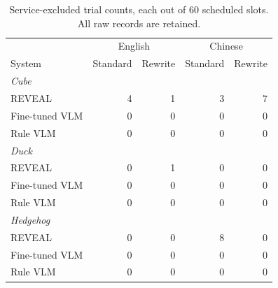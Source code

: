 \begin{table}[t]
\centering\footnotesize
\setlength{\tabcolsep}{2pt}
\begin{tabular}{@{}lrrrr@{}}
\toprule
 & \multicolumn{2}{c}{English} & \multicolumn{2}{c}{Chinese}\\
System & Standard & Rewrite & Standard & Rewrite\\
\midrule
\multicolumn{5}{l}{\textit{Cube}}\\
REVEAL & 4 & 1 & 3 & 7\\
Fine-tuned VLM & 0 & 0 & 0 & 0\\
Rule VLM & 0 & 0 & 0 & 0\\
\midrule
\multicolumn{5}{l}{\textit{Duck}}\\
REVEAL & 0 & 1 & 0 & 0\\
Fine-tuned VLM & 0 & 0 & 0 & 0\\
Rule VLM & 0 & 0 & 0 & 0\\
\midrule
\multicolumn{5}{l}{\textit{Hedgehog}}\\
REVEAL & 0 & 0 & 8 & 0\\
Fine-tuned VLM & 0 & 0 & 0 & 0\\
Rule VLM & 0 & 0 & 0 & 0\\
\bottomrule
\end{tabular}
\caption{Service-excluded trial counts, each out of 60 scheduled slots. All raw records are retained.}
\label{tab:language-exclusions}
\end{table}
